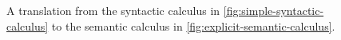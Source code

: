 \begin{figure}
  \begin{mdframed}
    \centering


  \end{mdframed}
  \caption{A translation from the syntactic calculus in
    \autoref{fig:simple-syntactic-calculus} to the semantic calculus
    in \autoref{fig:explicit-semantic-calculus}.}%
  \label{fig:translation-1}
\end{figure}

